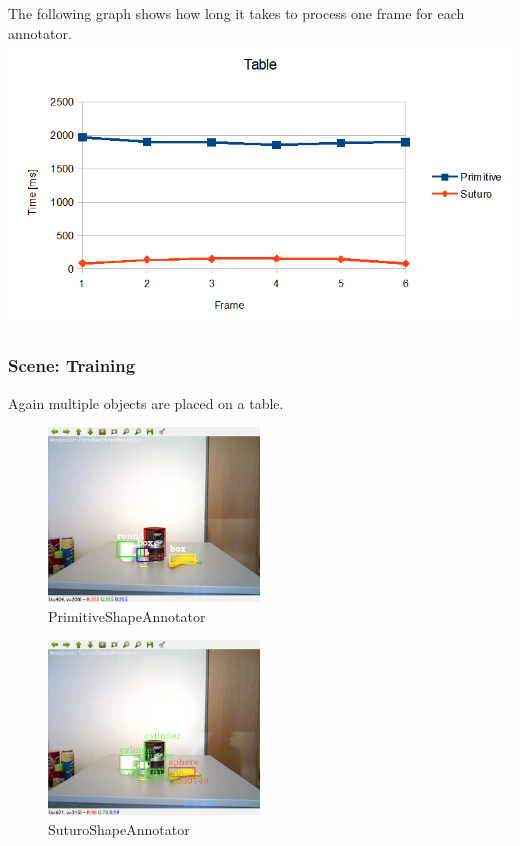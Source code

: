 \documentclass[main.tex]{subfiles}
\begin{document}
The following graph shows how long it takes to process one frame for each annotator.
{\center
  \includegraphics[width=1.2\textwidth]{pictures/perception/shape_annotator/classification_test_table/chart.png}
}
\newpage

\subsubsection{Scene: Training}
Again multiple objects are placed on a table.
\begin{figure}
  \center
  \includegraphics[width=0.5\textwidth]{pictures/perception/shape_annotator/classification_test_training/primitive.png}
  \caption{PrimitiveShapeAnnotator}
  \label{fig:shapeAnnotatorShelvePrimitive}
\end{figure}
\begin{figure}
  \center
  \includegraphics[width=0.5\textwidth]{pictures/perception/shape_annotator/classification_test_training/suturo.png}
  \caption{SuturoShapeAnnotator}
  \label{fig:shapeAnnotatorShelveSuturo}
\end{figure}
\end{document}
